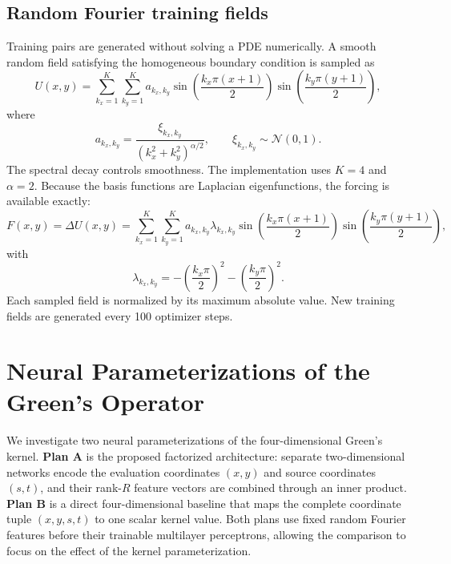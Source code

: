 \documentclass[11pt,a4paper]{article}
\begin{document}
\subsection{Random Fourier training fields}

Training pairs are generated without solving a PDE numerically. A smooth random field satisfying the homogeneous boundary condition is sampled as
\begin{equation}
  U(x,y)=\sum_{k_x=1}^{K}\sum_{k_y=1}^{K}
  a_{k_x,k_y}
  \sin\!\left(\frac{k_x\pi(x+1)}{2}\right)
  \sin\!\left(\frac{k_y\pi(y+1)}{2}\right),
  \label{eq:randomfield}
\end{equation}
where
\begin{equation}
  a_{k_x,k_y}=\frac{\xi_{k_x,k_y}}
  {(k_x^2+k_y^2)^{\alpha/2}},
  \qquad \xi_{k_x,k_y}\sim\mathcal{N}(0,1).
\end{equation}
The spectral decay controls smoothness. The implementation uses $K=4$ and $\alpha=2$. Because the basis functions are Laplacian eigenfunctions, the forcing is available exactly:
\begin{equation}
  F(x,y)=\Delta U(x,y)=
  \sum_{k_x=1}^{K}\sum_{k_y=1}^{K}
  a_{k_x,k_y}\lambda_{k_x,k_y}
  \sin\!\left(\frac{k_x\pi(x+1)}{2}\right)
  \sin\!\left(\frac{k_y\pi(y+1)}{2}\right),
\end{equation}
with
\begin{equation}
  \lambda_{k_x,k_y}=-\left(\frac{k_x\pi}{2}\right)^2
                         -\left(\frac{k_y\pi}{2}\right)^2.
\end{equation}
Each sampled field is normalized by its maximum absolute value. New training fields are generated every 100 optimizer steps.

\section{Neural Parameterizations of the Green's Operator}

We investigate two neural parameterizations of the four-dimensional Green's kernel. \textbf{Plan A} is the proposed factorized architecture: separate two-dimensional networks encode the evaluation coordinates $(x,y)$ and source coordinates $(s,t)$, and their rank-$R$ feature vectors are combined through an inner product. \textbf{Plan B} is a direct four-dimensional baseline that maps the complete coordinate tuple $(x,y,s,t)$ to one scalar kernel value. Both plans use fixed random Fourier features before their trainable multilayer perceptrons, allowing the comparison to focus on the effect of the kernel parameterization.
\end{document}
